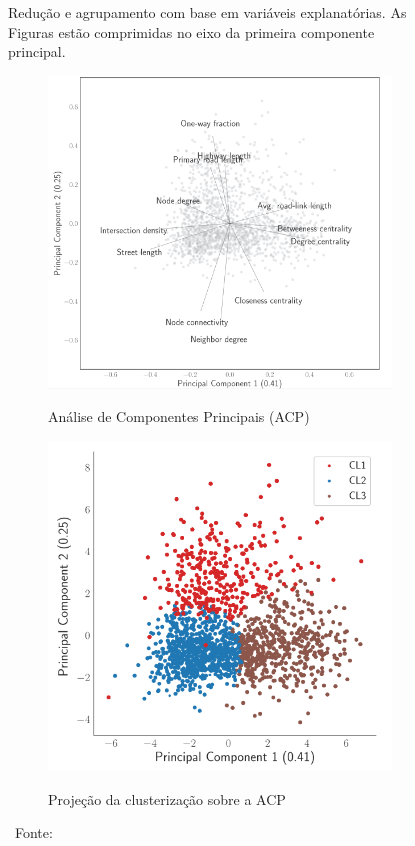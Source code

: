 \begin{figure}[htbp]
     \caption{Redução e agrupamento com base em variáveis explanatórias. As Figuras estão comprimidas no eixo da primeira componente principal.}
     \begin{subfigure}{.49\textwidth}
         \centering
         \caption{Análise de Componentes Principais (ACP)}
         \includegraphics[height=0.75\textwidth]{images/2_revisao/merchan_variables.png}
         \label{fig:merchanVariables}
     \end{subfigure}
     \begin{subfigure}{.49\textwidth}
       \centering
       \caption{Projeção da clusterização sobre a ACP}
       \includegraphics[height=0.75\textwidth]{images/2_revisao/merchan_clusterized.png}
       \label{fig:merchanClusterized}
     \end{subfigure}
     \caption*{\ Fonte: }
\end{figure}

